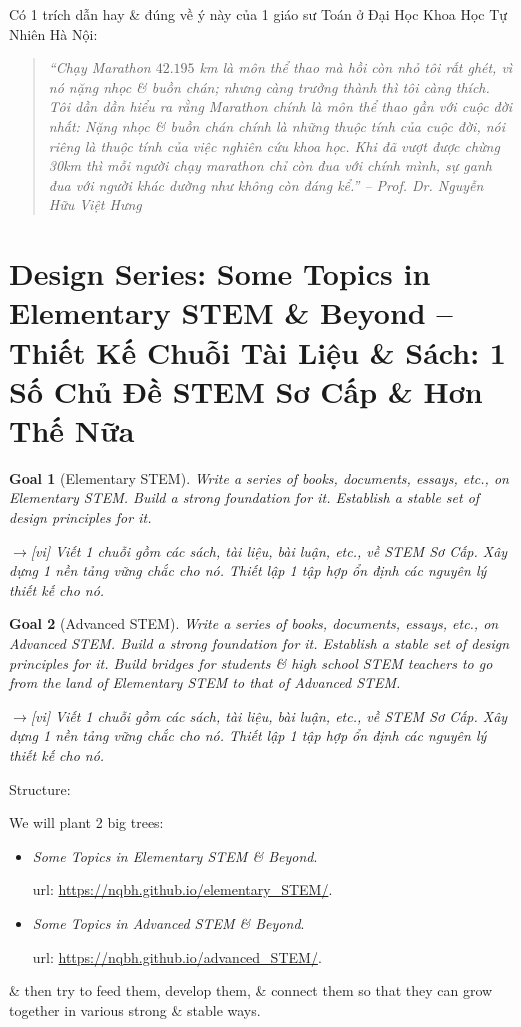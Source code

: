 \documentclass[12pt,twoside]{book}
\newtheorem{goal}{Goal}
\begin{document}
Có 1 trích dẫn hay \& đúng về ý này của 1 giáo sư Toán ở Đại Học Khoa Học Tự Nhiên Hà Nội:
\begin{quote}\it
	``Chạy Marathon $42.195$ km là môn thể thao mà hồi còn nhỏ tôi rất ghét, vì nó nặng nhọc \& buồn chán; nhưng càng trưởng thành thì tôi càng thích. Tôi dần dần hiểu ra rằng Marathon chính là môn thể thao gần với cuộc đời nhất: Nặng nhọc \& buồn chán chính là những thuộc tính của cuộc đời, nói riêng là thuộc tính của việc nghiên cứu khoa học. Khi đã vượt được chừng 30km thì mỗi người chạy marathon chỉ còn đua với chính mình, sự ganh đua với người khác dường như không còn đáng kể.'' -- Prof. Dr. {\sc Nguyễn Hữu Việt Hưng}
\end{quote}

\section{Design Series: Some Topics in Elementary STEM \& Beyond -- Thiết Kế Chuỗi Tài Liệu \& Sách: 1 Số Chủ Đề STEM Sơ Cấp \& Hơn Thế Nữa}

\begin{goal}[Elementary STEM]
	Write a series of books, documents, essays, etc., on Elementary STEM. Build a strong foundation for it. Establish a stable set of design principles for it.
	
	{\sf[en]$\to$[vi]} Viết 1 chuỗi gồm các sách, tài liệu, bài luận, etc., về STEM Sơ Cấp. Xây dựng 1 nền tảng vững chắc cho nó. Thiết lập 1 tập hợp ổn định các nguyên lý thiết kế cho nó.
\end{goal}

\begin{goal}[Advanced STEM]
	Write a series of books, documents, essays, etc., on Advanced STEM. Build a strong foundation for it. Establish a stable set of design principles for it. Build bridges for students \& high school STEM teachers to go from the land of Elementary STEM to that of Advanced STEM.
	
	{\sf[en]$\to$[vi]} Viết 1 chuỗi gồm các sách, tài liệu, bài luận, etc., về STEM Sơ Cấp. Xây dựng 1 nền tảng vững chắc cho nó. Thiết lập 1 tập hợp ổn định các nguyên lý thiết kế cho nó.
\end{goal}

\begin{center}
	{\sf Structure}: 
\end{center}
We will plant 2 big trees:
\begin{itemize}
	\item {\it Some Topics in Elementary STEM \& Beyond}.
	
	{\sc url}: \url{https://nqbh.github.io/elementary_STEM/}.
	\item {\it Some Topics in Advanced STEM \& Beyond}.
	
	{\sc url}: \url{https://nqbh.github.io/advanced_STEM/}.
\end{itemize}
\& then try to feed them, develop them, \& connect them so that they can grow together in various strong \& stable ways.
\end{document}
